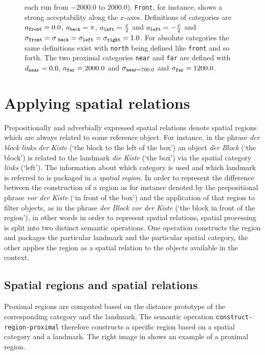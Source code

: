 \begin{figure}
{ each run from $-2000.0$ to $2000.0$). 
 {\footnotesize\tt Front}, for instance, shows a strong acceptability along the $x$-axes. Definitions of 
categories are $a_{\mathtt{\footnotesize front}}=0.0$, $a_{\mathtt{\footnotesize back}}=\pi$, 
$a_{\mathtt{\footnotesize left}}=\frac{\pi}{2}$ and $a_\mathtt{{\footnotesize left}}=-\frac{\pi}{2}$ and
$\sigma_{\mathtt{\footnotesize front}}=\sigma_{\mathtt{\footnotesize\ back}}=\sigma_\mathtt{{\footnotesize left}}=\sigma_{\mathtt{\footnotesize right}} = 1.0$.
For absolute categories the same definitions exist with {\footnotesize\tt north} being defined like {\footnotesize\tt front}
and so forth.
The two proximal categories {\footnotesize\tt near} and {\footnotesize\tt far} are defined 
with $d_{\mathtt{\footnotesize near}}=0.0$, $a_{\mathtt{\footnotesize far}}=2000.0$ and 
$\sigma_{\mathtt{\footnotesize near}=700.0}$ and $\sigma_{\mathtt{\footnotesize far}}=1200.0$.}
\end{figure}


\section{Applying spatial relations}
Prepositionally and adverbially expressed spatial relations denote 
spatial regions which are always related to some reference object.
For instance, in the phrase \textit{der block links der Kiste} (`the block to the left
of the box') an object \textit{der Block} (`the block') is related to the landmark 
\textit{die Kiste} (`the box') via the spatial category \textit{links} (`left'). 
The information about which category is used and which landmark
is referred to is packaged in a \emph{spatial region}.
In order to represent the difference between the construction of a region
as for instance denoted by the prepositional phrase \textit{vor der Kiste}
(`in front of the box') and the application of that region to filter objects,
as in the phrase \textit{der Block vor der Kiste} (`the block in front of the region'),
in other words in order to represent spatial relations, spatial 
processing is split into two distinct semantic operations. One operation
constructs the region and packages the particular landmark and the particular
spatial category, the other applies the region as a spatial relation 
to the objects available in the context.

\subsection{Spatial regions and spatial relations}
Proximal regions are computed based on the distance prototype of the 
corresponding category and the landmark. The semantic operation
{\footnotesize\tt construct-region-proximal} therefore constructs a specific 
region based on a spatial category and a landmark. 
The right image in  
shows an example of a proximal region. 

